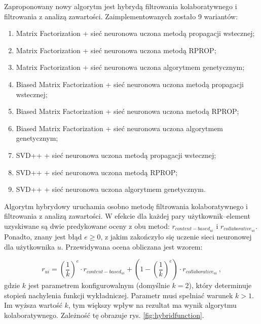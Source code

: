 \documentclass[twoside]{iisthesis}
\begin{document}
		 Zaproponowany nowy algorytm jest hybrydą filtrowania kolaboratywnego i filtrowania z analizą zawartości. Zaimplementowanych zostało 9 wariantów:
		 
		 \begin{enumerate}
		 	\item Matrix Factorization + sieć neuronowa uczona metodą propagacji wstecznej;
		 	\item Matrix Factorization + sieć neuronowa uczona metodą RPROP;
		 	\item Matrix Factorization + sieć neuronowa uczona algorytmem genetycznym;
		 	\item Biased Matrix Factorization + sieć neuronowa uczona metodą propagacji wstecznej;
		 	\item Biased Matrix Factorization + sieć neuronowa uczona metodą RPROP;
		 	\item Biased Matrix Factorization + sieć neuronowa uczona algorytmem genetycznym;		 	
		 	\item SVD++ + sieć neuronowa uczona metodą propagacji wstecznej;
		 	\item SVD++ + sieć neuronowa uczona metodą RPROP;
		 	\item SVD++ + sieć neuronowa uczona algorytmem genetycznym.
		 \end{enumerate}
		 
		 
		 Algorytm hybrydowy uruchamia osobno metodę filtrowania kolaboratywnego i filtrowania z analizą zawartości. W efekcie dla każdej pary użytkownik--element uzyskiwane są dwie  predykowane oceny z obu metod:  $r_{content-based_{ui}}$ i $r_{collaborative_{ui}}$. Ponadto, znany jest błąd $e \geq 0$, z jakim zakończyło się uczenie sieci neuronowej dla użytkownika $u$. Przewidywana ocena obliczana jest wzorem:
		 
		 \begin{equation}
		 	\label{eq:hybrid}		 	
		 	 r_{ui} = (\frac{1}{k})^e \cdot r_{content-based_{ui}} + (1-(\frac{1}{k})^e) \cdot r_{collaborative_{ui}}
		 	\,,
		 \end{equation}		 
		 gdzie $k$ jest parametrem konfigurowalnym (domyślnie $k = 2$), który determinuje stopień nachylenia funkcji wykładniczej. Parametr musi spełniać warunek $k>1$. Im wyższa wartość $k$, tym większy wpływ na rezultat ma wynik algorytmu kolaboratywnego. Zależność tę obrazuje rys. \ref{fig:hybridfunction}.
		 
\end{document}
